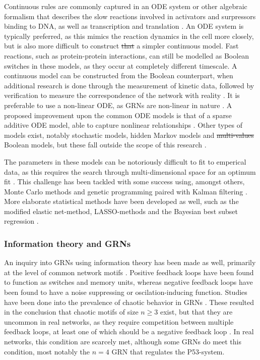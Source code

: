\documentclass{article}
\providecommand{\DIFaddtex}[1]{{\protect\color{blue}\uwave{#1}}} %
\providecommand{\DIFdeltex}[1]{{\protect\color{red}\sout{#1}}}                      %
\providecommand{\DIFaddbegin}{} %
\providecommand{\DIFaddend}{} %
\providecommand{\DIFdelbegin}{} %
\providecommand{\DIFdelend}{} %
\providecommand{\DIFadd}[1]{\texorpdfstring{\DIFaddtex{#1}}{#1}} %
\providecommand{\DIFdel}[1]{\texorpdfstring{\DIFdeltex{#1}}{}} %
\begin{document}
Continuous rules are commonly captured in an ODE system or other algebraic formalism that describes the slow reactions involved in activators and surpressors binding to DNA, as well as transcription and translation \cite{ingram2006network}.
An ODE system is typically preferred, as this mimics the reaction dynamics in the cell more closely, but is also more difficult to construct \DIFdelbegin \DIFdel{that }\DIFdelend \DIFaddbegin \DIFadd{than }\DIFaddend a simpler continuous model.
Fast reactions, such as protein-protein interactions, can still be modelled as Boolean switches in these models, as they occur at completely different timescale.
A continuous model can be constructed  from the Boolean counterpart, when additional research is done through the measurement of kinetic data, followed by verification to measure the correspondence of the network with reality \cite{bolouri2002modeling}.
It is preferable to use a non-linear ODE, as GRNs are non-linear in nature \cite{qian2008inference, tyson2003sniffers}.
A proposed improvement upon the common ODE models is that of a sparse additive ODE model, able to capture nonlinear relationships \cite{wu2014sparse}.
Other types of models exist, notably stochastic models, hidden Markov models and \DIFdelbegin \DIFdel{multi-values }\DIFdelend \DIFaddbegin \DIFadd{multi-valued }\DIFaddend Boolean models, but these fall outside the scope of this research \cite{bolouri2002modeling, wu2014sparse}.

The parameters in these models can be notoriously difficult to fit to emperical data, as this requires the search through multi-dimensional space for an optimum fit \cite{bolouri2002modeling, kuhn2009monte}.
This challenge has been tackled with some success using, amongst others, Monte Carlo methods and genetic programming paired with Kalman filtering \cite{qian2008inference, kuhn2009monte}.
More elaborate statistical methods have been developed as well, such as the modified elastic net-method, LASSO-methods and the Bayesian best subset regression \cite{greenfield2013robust, wu2014sparse}.

\subsubsection{Information theory and GRNs}

An inquiry into GRNs using information theory has been made as well, primarily at the level of common network motifs \cite{zhang2012chaotic}.
Positive feedback loops have been found to function as switches and memory units, whereas negative feedback loops have been found to have a noise suppressing or oscilation-inducing function.
Studies have been done into the prevalence of chaotic behavior in GRNs \cite{zhang2012chaotic}.
These resulted in the conclusion that chaotic motifs of size $n\ge 3$ exist, but that they are uncommon in real networks, as they require competition between multiple feedback loops, at least one of which should be a negative feedback loop \cite{zhang2012chaotic}.
In real networks, this condition are scarcely met, although some GRNs do meet this condition, most notably the $n=4$ GRN that regulates the P53-system.
\end{document}
